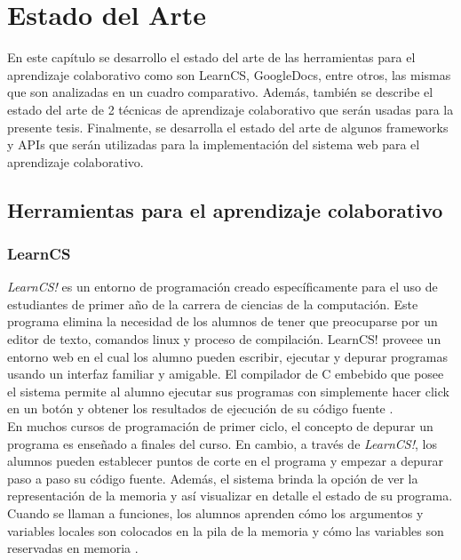 \chapter{Estado del Arte}
\label{cap:estado_del_arte}
En este capítulo se desarrollo el estado del arte de las herramientas para el aprendizaje colaborativo como son LearnCS, GoogleDocs, entre otros, las mismas que son analizadas en un cuadro comparativo. Además, también se describe el estado del arte de 2 técnicas de aprendizaje colaborativo que serán usadas para la presente tesis. Finalmente, se desarrolla el estado del arte de algunos frameworks y APIs que serán utilizadas para la implementación del sistema web para el aprendizaje colaborativo.

\section{Herramientas para el aprendizaje colaborativo}

\subsection{LearnCS}
\emph{LearnCS!} es un entorno de programación creado específicamente para el uso de estudiantes de primer año de la carrera de ciencias de la computación. Este programa elimina la necesidad de los alumnos de tener que preocuparse por un editor de texto, comandos linux y proceso de compilación. LearnCS! proveee un entorno web en el cual los alumno pueden escribir, ejecutar y depurar programas usando un interfaz familiar y amigable. El compilador de C embebido que posee el sistema permite al alumno ejecutar sus programas con simplemente hacer click en un botón y obtener los resultados de ejecución de su código fuente \cite{lipman_learncs_2014}.\\

En muchos cursos de programación de primer ciclo, el concepto de depurar un programa es enseñado a finales del curso. En cambio, a través de \emph{LearnCS!}, los alumnos pueden establecer puntos de corte en el programa y empezar a depurar paso a paso su código fuente. Además, el sistema brinda la opción de ver la representación de la memoria y así visualizar en detalle el estado de su programa. Cuando se llaman a funciones, los alumnos aprenden cómo los argumentos y variables locales son colocados en la pila de la memoria y cómo las variables son reservadas en memoria \cite{lipman_learncs_2014}.\\

